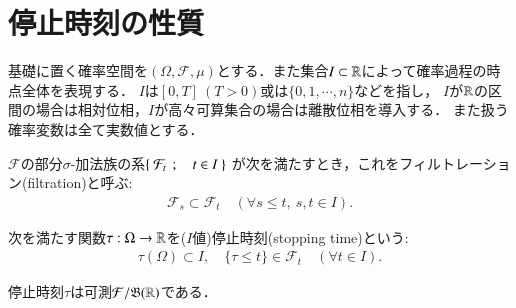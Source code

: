 \section{停止時刻の性質}
	基礎に置く確率空間を$(\Omega,\mathcal{F},\mu)$とする．また集合$I \subset \mathbb{R}$によって確率過程の時点全体を表現する．
	$I$は$[0,T]\ (T > 0)$或は$\{0,1,\cdots,n\}$などを指し，
	$I$が$\mathbb{R}$の区間の場合は相対位相，$I$が高々可算集合の場合は離散位相を導入する．
	また扱う確率変数は全て実数値とする．
	\begin{screen}
		\begin{dfn}[フィルトレーション]
			$\mathcal{F}$の部分$\sigma$-加法族の系$\left\{\ \mathcal{F}_t\ \, ; \quad t \in I\ \right\}$
			が次を満たすとき，これをフィルトレーション(filtration)と呼ぶ:
			\begin{align}
				\mathcal{F}_s \subset \mathcal{F}_t
				\quad (\forall s \leq t,\ s,t \in I).
			\end{align}
		\end{dfn}
	\end{screen}
	
	\begin{screen}
		\begin{dfn}[停止時刻]
			次を満たす関数$\tau:\Omega \rightarrow \mathbb{R}$を($I$値)停止時刻(stopping time)という:
			\begin{align}
				\tau(\Omega) \subset I,
				\quad \{ \tau \leq t \} \in \mathcal{F}_t \quad (\forall t \in I).
			\end{align}
		\end{dfn}
	\end{screen}
	
	\begin{screen}
		\begin{thm}[停止時刻は可測写像]
			停止時刻$\tau$は可測$\mathcal{F}/\mathfrak{B}(\mathbb{R})$である．
		\end{thm}
	\end{screen}
	
